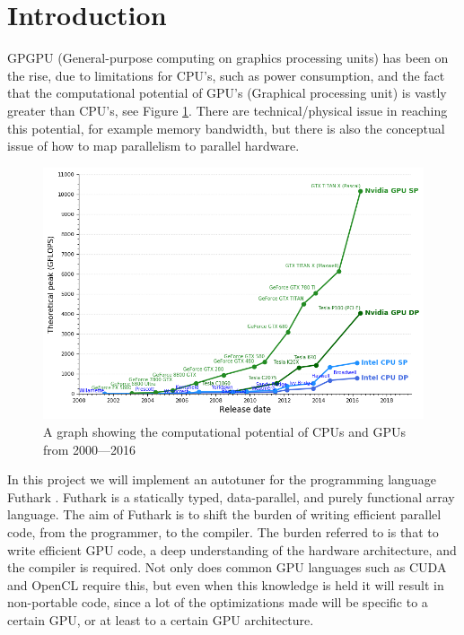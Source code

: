 \section{Introduction}
GPGPU (General-purpose computing on graphics processing units) has been on the
rise, due to limitations for CPU's, such as power consumption, and the fact
that the computational potential of GPU's (Graphical processing unit) is vastly
greater than CPU's, see Figure \ref{potential}. There are technical/physical
issue in reaching this potential, for example memory bandwidth, but there is
also the conceptual issue of how to map parallelism to parallel hardware.
\begin{figure}[h]
	\centering
	\includegraphics[width=.8\textwidth]{resources/graf.png}
	\caption{A graph showing the computational potential of CPUs and GPUs from 2000---2016 \cite{cpu-vs-gpu}}
	\label{potential}
\end{figure}

In this project we will implement an autotuner for the programming language
Futhark \cite{futhark-home}. Futhark is a statically typed, data-parallel, and
purely functional array language. The aim of Futhark is to shift the burden of
writing efficient parallel code, from the programmer, to the compiler. The
burden referred to is that to write efficient GPU code, a deep understanding of
the hardware architecture, and the compiler is required. Not only does common GPU languages such as CUDA and OpenCL require this, but even when this knowledge is
held it will result in non-portable code, since a lot of the optimizations made
will be specific to a certain GPU, or at least to a certain GPU architecture. 

